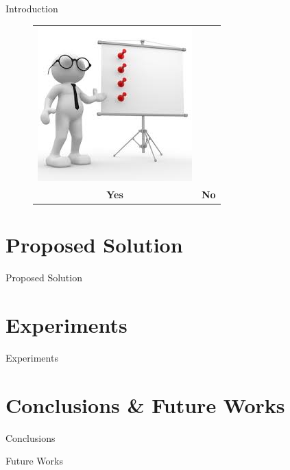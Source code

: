 \documentclass{beamer}
\begin{document}
\begin{frame}{Introduction}
\begin{overlayarea}{\textwidth}{10cm}
\begin{figure}[t]
{\begin{tabular}{cc}
						\includegraphics[scale=0.4]{images/list} \\
						\textbf{Yes} & \textbf{No} \\
					\end{tabular}
				}
				
			\end{figure}
		\end{overlayarea} 
	\end{frame}

	
	\section{Proposed Solution}
	\begin{frame}{Proposed Solution}
	\end{frame}
	
	\section{Experiments}
	\begin{frame}{Experiments}
	\end{frame}
	
	\section{Conclusions \& Future Works}
	\begin{frame}{Conclusions}	
	\end{frame}
	
	\begin{frame}{Future Works}	
	\end{frame}
	
	
\end{document}
